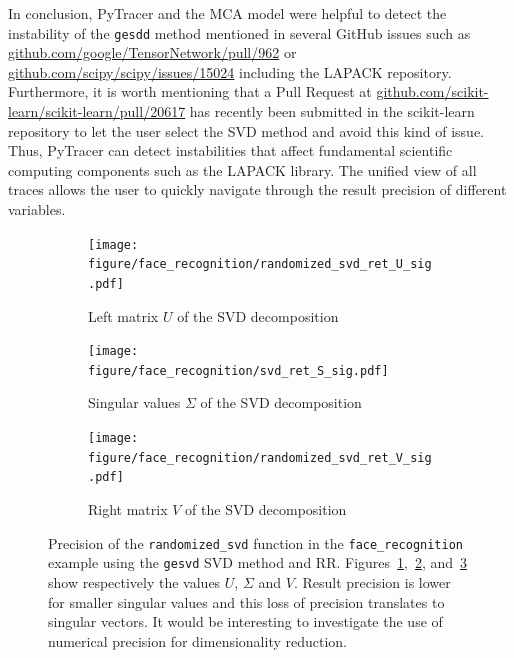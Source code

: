 \documentclass[10pt,journal,compsoc]{IEEEtran}
\newcommand{\pytracer}[0]{PyTracer\xspace}
\DeclareRobustCommand{\add}[1]{\textcolor{ao(english)}{#1}}%
\DeclareRobustCommand{\add}[1]{#1}
\begin{document}
In conclusion, \pytracer and the MCA model were helpful to detect the
instability of the \texttt{gesdd} method mentioned in several GitHub issues such as
\href{https://github.com/google/TensorNetwork/pull/962}{github.com/google/TensorNetwork/pull/962} or
\href{https://github.com/scipy/scipy/issues/15024}{github.com/scipy/scipy/issues/15024}
including the LAPACK repository. Furthermore, it is worth mentioning that a Pull
Request \add{at} \href{https://github.com/scikit-learn/scikit-learn/pull/20617}{github.com/scikit-learn/scikit-learn/pull/20617}
has recently been submitted in the scikit-learn repository to let the user select the SVD method and
avoid this kind of issue. Thus, \pytracer can detect instabilities that affect
fundamental scientific computing components such as the LAPACK library. The
unified view of all traces allows the user to quickly navigate through the
result precision of different variables.



\begin{figure}
    \centering
    \begin{subfigure}{0.3\linewidth}
        \texttt{[image: figure/face\_recognition/randomized\_svd\_ret\_U\_sig.pdf]}
        \caption{Left matrix $U$ of the SVD decomposition}
        \label{fig:randomized_svd_U}
    \end{subfigure}
    \begin{subfigure}{0.3\linewidth}
        \texttt{[image: figure/face\_recognition/svd\_ret\_S\_sig.pdf]}
        \caption{Singular values $\Sigma$ of the SVD decomposition}
        \label{fig:randomized_svd_S}
    \end{subfigure}
    \begin{subfigure}{0.3\linewidth}
        \texttt{[image: figure/face\_recognition/randomized\_svd\_ret\_V\_sig.pdf]}
        \caption{Right matrix $V$ of the SVD decomposition}
        \label{fig:randomized_svd_V}
    \end{subfigure}
    \caption{Precision of the \texttt{randomized\_svd} function in the
        \texttt{face\_recognition} example using the \texttt{gesvd} SVD method
        and RR. Figures~\ref{fig:randomized_svd_U},~\ref{fig:randomized_svd_S},
        and~\ref{fig:randomized_svd_V} show respectively the values $U$,
        $\Sigma$ and $V$. Result precision is lower for smaller singular
        values and this loss of precision translates to singular vectors. It
        would be interesting to investigate the use of numerical precision for
        dimensionality reduction. }
    \label{fig:face_recognition_svd}
\end{figure}
\end{document}
